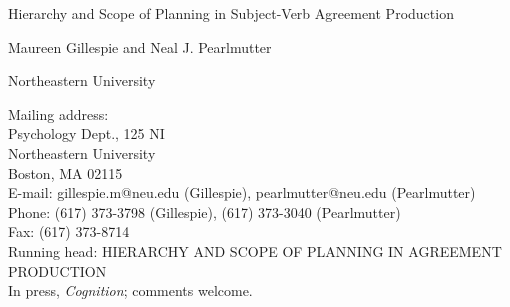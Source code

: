 \documentclass[12pt,titlepage]{article}
\newcommand{\itt}{\textit}  %
\begin{document}

\begin{titlepage}
\thispagestyle{myheadings}  %
\begin{center}

\vspace*{\fill}  %

{\Large Hierarchy and Scope of Planning in Subject-Verb Agreement 
Production}

\vfill

{\large Maureen Gillespie and Neal J. Pearlmutter

Northeastern University

\vfill

}
\end{center}

\vfill

\begin{flushleft}

Mailing address: \\
Psychology Dept., 125 NI \\
Northeastern University \\
Boston, MA 02115 \\[\baselineskip]

E-mail: gillespie.m@neu.edu (Gillespie), pearlmutter@neu.edu (Pearlmutter) \\
Phone: (617) 373-3798 (Gillespie), (617) 373-3040 (Pearlmutter) \\
Fax: (617) 373-8714 \\[\baselineskip]

Running head: HIERARCHY AND SCOPE OF PLANNING IN AGREEMENT PRODUCTION
\\[\baselineskip]

In press, \itt{Cognition}; comments welcome. \\
\end{flushleft}

\end{titlepage}
\end{document}
